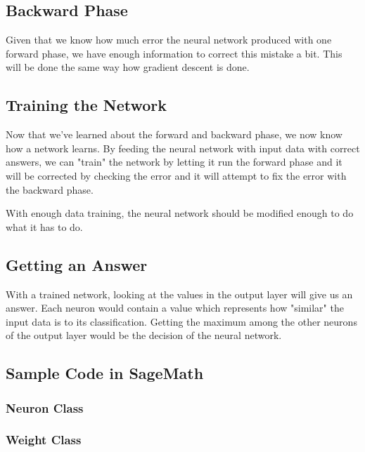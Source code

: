 \documentclass[a4paper, 11pt, english]{article}
\begin{document}
\subsection{Backward Phase}
\par Given that we know how much error the neural network produced with one forward phase, we have enough information to correct this mistake a bit. This will be done the same way how gradient descent is done. %

\subsection{Training the Network}
\par Now that we've learned about the forward and backward phase, we now know how a network learns. By feeding the neural network with input data with correct answers, we can "train" the network by letting it run the forward phase and it will be corrected by checking the error and it will attempt to fix the error with the backward phase.
\par With enough data training, the neural network should be modified enough to do what it has to do.

\subsection{Getting an Answer}
\par With a trained network, looking at the values in the output layer will give us an answer. Each neuron would contain a value which represents how "similar" the input data is to its classification. Getting the maximum among the other neurons of the output layer would be the decision of the neural network.

\subsection{Sample Code in SageMath}
\subsubsection{Neuron Class}

\subsubsection{Weight Class}

\end{document}
